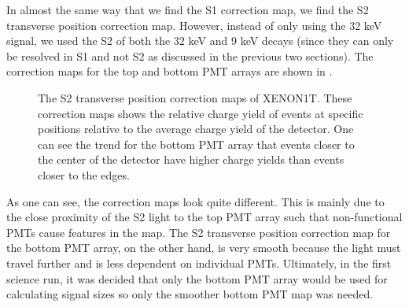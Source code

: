 In almost the same way that we find the S1 correction map, we find the S2 transverse position correction map.  However, instead of only using the 32 keV signal, we used the S2 of both the 32 keV and 9 keV decays (since they can only be resolved in S1 and not S2 as discussed in the previous two sections).  The correction maps for the top and bottom PMT arrays are shown in .


\begin{figure}[t]
	\centering
	 \hfill
	\caption{The S2 transverse position correction maps of XENON1T.  These correction maps shows the relative charge yield of events at specific positions relative to the average charge yield of the detector.  One can see the trend for the bottom PMT array that events closer to the center of the detector have higher charge yields than events closer to the edges.}
	\label{fig:xe1t_s2_correction_map_xy}
\end{figure}

As one can see, the correction maps look quite different.  This is mainly due to the close proximity of the S2 light to the top PMT array such that non-functional PMTs cause features in the map.  The S2 transverse position correction map for the bottom PMT array, on the other hand, is very smooth because the light must travel further and is less dependent on individual PMTs.  Ultimately, in the first science run, it was decided that only the bottom PMT array would be used for calculating signal sizes so only the smoother bottom PMT map was needed.

